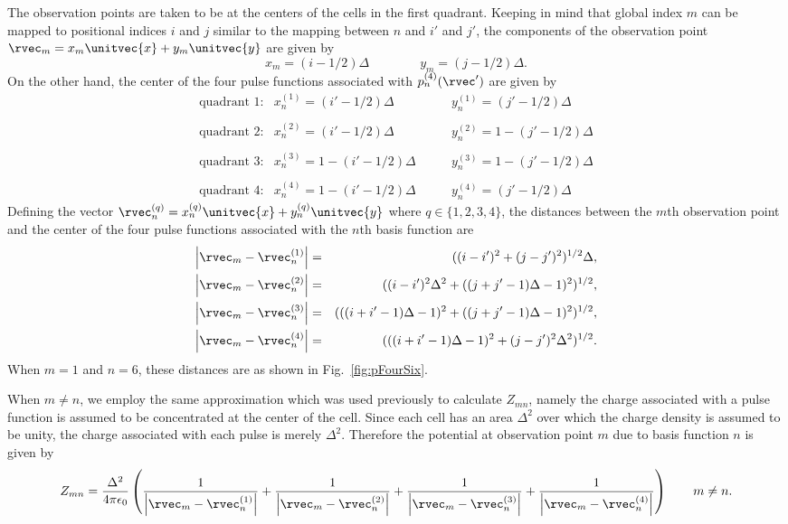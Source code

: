 The observation points are taken to be at the centers of the cells
in the first quadrant.  Keeping in mind that global index $m$ can be
mapped to positional indices $i$ and $j$ similar to the mapping
between $n$ and $i'$ and $j'$, the components of the observation point
$\rvec_m=x_m\unitvec{x} + y_m\unitvec{y}$ are given by
\begin{equation}
  x_m = (i-1/2)\Delta \qquad\qquad y_m = (j-1/2)\Delta.
\end{equation}
On the other hand, the center of the four pulse functions associated with
$p_n^{(4)}(\rvec')$ are given by
\begin{equation}
  \begin{array}{lll}
    \text{quadrant 1:} &
       x_n^{(1)} = (i'-1/2)\Delta & y_n^{(1)} = (j'-1/2)\Delta \\
    \\
    \text{quadrant 2:} &
       x_n^{(2)} = (i'-1/2)\Delta & y_n^{(2)} = 1-(j'-1/2)\Delta \\
    \\
    \text{quadrant 3:} &
       x_n^{(3)} = 1-(i'-1/2)\Delta & y_n^{(3)} = 1-(j'-1/2)\Delta \\
    \\
    \text{quadrant 4:} &
       x_n^{(4)} = 1-(i'-1/2)\Delta\qquad & y_n^{(4)} = (j'-1/2)\Delta
  \end{array}
\end{equation}
Defining the vector $\rvec_n^{(q)}=x_n^{(q)}\unitvec{x} +
y_n^{(q)}\unitvec{y}$ where $q\in \{1,2,3,4\}$, the distances between
the $m$th observation point and the center of the four pulse functions
associated with the $n$th basis function are
\begin{eqnarray}
  \left|\rvec_m-\rvec_n^{(1)}\right| &=& 
   ((i-i')^2 + (j-j')^2)^{1/2}\Delta, \\
  \left|\rvec_m-\rvec_n^{(2)}\right| &=& 
   ((i-i')^2\Delta^2 + ((j+j'-1)\Delta-1)^2)^{1/2}, \\
  \left|\rvec_m-\rvec_n^{(3)}\right| &=& 
   (((i+i'-1)\Delta-1)^2 + ((j+j'-1)\Delta-1)^2)^{1/2}, \\
  \left|\rvec_m-\rvec_n^{(4)}\right| &=& 
   (((i+i'-1)\Delta-1)^2  + (j-j')^2\Delta^2)^{1/2}.
\end{eqnarray}
When $m=1$ and $n=6$, these distances are as shown in
Fig.\ \ref{fig:pFourSix}. 

When $m\neq n$, we employ the same approximation which was used
previously to calculate $Z_{mn}$, namely the charge associated with a
pulse function is assumed to be concentrated at the center of the
cell.  Since each cell has an area $\Delta^2$ over which the charge
density is assumed to be unity, the charge associated with each pulse
is merely $\Delta^2$.  Therefore the potential at observation point
$m$ due to basis function $n$ is given by
\begin{equation}
  Z_{mn} = \frac{\Delta^2}{4\pi\epsilon_0}
  \left(
    \frac{1}{\left|\rvec_m - \rvec_n^{(1)}\right|}
    + \frac{1}{\left|\rvec_m - \rvec_n^{(2)}\right|}
    + \frac{1}{\left|\rvec_m - \rvec_n^{(3)}\right|}
    + \frac{1}{\left|\rvec_m - \rvec_n^{(4)}\right|}
 \right) \qquad m\neq n.
\end{equation}

